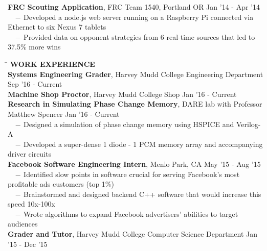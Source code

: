 \documentclass[10.75pt]{article}
\newcommand{\sectionNL}{\\[2pt]}
\newcommand{\customtab}{$\hspace{10pt} - \hspace{2pt}$}
\newcommand{\customtabinline}{$\hspace{23pt}$}
\begin{document}
\begin{tabbing}
	\textbf{FRC Scouting Application}, FRC Team 1540, Portland OR \> Jan '14 - Apr '14 \\
	\customtab Developed a node.js web server running on a Raspberry Pi connected via Ethernet to six Nexus 7 tablets \\
	\customtab Provided data on opponent strategies from 6 real-time sources that led to 37.5\% more wins
	
\end{tabbing}

\begin{tabbing} 
	\hspace*{6.5in}\= \kill
	{\textbf{WORK EXPERIENCE} } \> \sectionNL
	\textbf{Systems Engineering Grader}, Harvey Mudd College Engineering Department \>Sep '16 - Current \\

	\textbf{Machine Shop Proctor}, Harvey Mudd College Shop \>Jan '16 - Current \\

	\textbf{Research in Simulating Phase Change Memory}, DARE lab with Professor Matthew Spencer \>Jan '16 - Current \\
	\customtab Designed a simulation of phase change memory using HSPICE and Verilog-A \\
	\customtab Developed a super-dense 1 diode - 1 PCM memory array and accompanying driver circuits \\

	\textbf{Facebook Software Engineering Intern}, Menlo Park, CA \> May '15 - Aug '15 \\
	\customtab Identified slow points in software crucial for serving Facebook's most profitable ads customers (top 1\%)\\
	\customtab Brainstormed and designed backend C++ software that would increase this speed 10x-100x\\
	\customtab Wrote algorithms to expand Facebook advertisers' abilities to target audiences \\
	\textbf{Grader and Tutor}, Harvey Mudd College Computer Science Department \>Jan '15 - Dec '15 \\


\end{tabbing}
\end{document}
